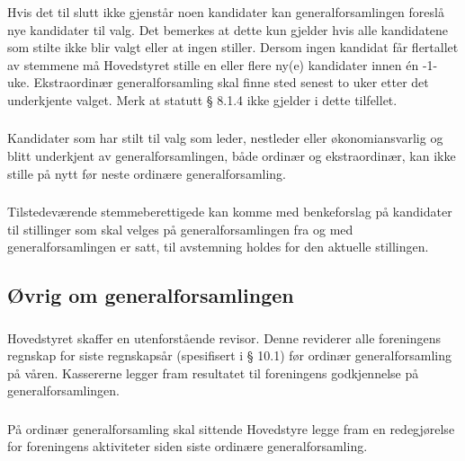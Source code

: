\subsubsection{}
Hvis det til slutt ikke gjenstår noen kandidater kan generalforsamlingen
foreslå nye kandidater til valg. Det bemerkes at dette kun gjelder hvis alle
kandidatene som stilte ikke blir valgt eller at ingen stiller. Dersom ingen
kandidat får flertallet av stemmene må Hovedstyret stille en eller flere ny(e)
kandidater innen én -1- uke. Ekstraordinær generalforsamling skal finne sted
senest to uker etter det underkjente valget. Merk at statutt § 8.1.4 ikke
gjelder i dette tilfellet.

\subsubsection{}
Kandidater som har stilt til valg som leder, nestleder eller økonomiansvarlig
og blitt underkjent av generalforsamlingen, både ordinær og ekstraordinær, kan
ikke stille på nytt før neste ordinære generalforsamling.

\subsubsection{}
Tilstedeværende stemmeberettigede kan komme med benkeforslag på kandidater til
stillinger som skal velges på generalforsamlingen fra og med
generalforsamlingen er satt, til avstemning holdes for den aktuelle stillingen.

\subsection{Øvrig om generalforsamlingen}
\subsubsection{}
Hovedstyret skaffer en utenforstående revisor. Denne reviderer alle foreningens
regnskap for siste regnskapsår (spesifisert i § 10.1) før ordinær
generalforsamling på våren.  Kassererne legger fram resultatet til foreningens
godkjennelse på generalforsamlingen.

\subsubsection{}
På ordinær generalforsamling skal sittende Hovedstyre legge fram en
redegjørelse for foreningens aktiviteter siden siste ordinære
generalforsamling.

